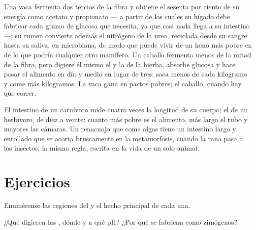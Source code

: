 \begin{example}\label{ex:b1:digestion-absorption:cowhorse}
Una vaca fermenta dos tercios de la fibra y obtiene el sesenta por ciento de
su energía como acetato y propionato --- a partir de los cuales su hígado
debe fabricar cada gramo de glucosa que necesita, ya que casi nada llega a
su intestino ---; su rumen convierte además el nitrógeno de la urea,
reciclada desde su sangre hasta su saliva, en  microbiana, de modo
que puede vivir de un heno más pobre en  de lo que podría cualquier
otro mamífero. Un caballo fermenta menos de la mitad de la fibra, pero
digiere él mismo el  y la  de la hierba, absorbe glucosa y
hace pasar el alimento en día y medio en lugar de tres: saca menos de cada
kilogramo y come más kilogramos. La vaca gana en pastos pobres; el caballo,
cuando hay que correr.
\end{example}

\begin{remark}\label{rem:b1:digestion-absorption:length}
El intestino de un carnívoro mide cuatro veces la longitud de su cuerpo; el
de un herbívoro, de diez a veinte: cuanto más pobre es el alimento, más
largo el tubo y mayores las cámaras. Un renacuajo que come algas tiene un
intestino largo y enrollado que se acorta bruscamente en la metamorfosis,
cuando la rana pasa a los insectos; la misma regla, escrita en la vida de un
solo animal.
\end{remark}

\section{Ejercicios}

\begin{exercise}[$\star$]\label{exo:b1:digestion-absorption:1}
Enumérense las regiones del  y el hecho principal de cada una.
\end{exercise}

\begin{exercise}[$\star$]\label{exo:b1:digestion-absorption:2}
¿Qué  digieren las , dónde y a qué pH? ¿Por qué se fabrican
como zimógenos?
\end{exercise}

